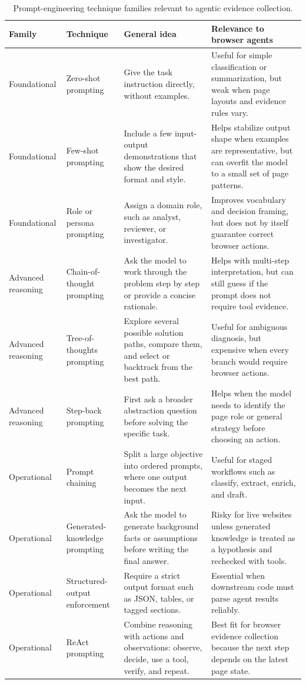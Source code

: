 \begin{table}[!htbp]
\centering
\footnotesize
\begin{tabularx}{\textwidth}{Q{2.55cm} Q{3.0cm} Y Y}
\toprule
{}
Family & Technique & General idea & Relevance to browser agents \\ \midrule
Foundational & Zero-shot prompting & Give the task instruction directly, without
examples. & Useful for simple classification or summarization, but weak when page
layouts and evidence rules vary. \\
Foundational & Few-shot prompting & Include a few input-output demonstrations that
show the desired format and style. & Helps stabilize output shape when examples are
representative, but can overfit the model to a small set of page patterns. \\
Foundational & Role or persona prompting & Assign a domain role, such as analyst,
reviewer, or investigator. & Improves vocabulary and decision framing, but does not by
itself guarantee correct browser actions. \\
Advanced reasoning & Chain-of-thought prompting & Ask the model to work through the
problem step by step or provide a concise rationale. & Helps with multi-step
interpretation, but can still guess if the prompt does not require tool evidence. \\
Advanced reasoning & Tree-of-thoughts prompting & Explore several possible solution
paths, compare them, and select or backtrack from the best path. & Useful for ambiguous
diagnosis, but expensive when every branch would require browser actions. \\
Advanced reasoning & Step-back prompting & First ask a broader abstraction question
before solving the specific task. & Helps when the model needs to identify the page
role or general strategy before choosing an action. \\
Operational & Prompt chaining & Split a large objective into ordered prompts, where
one output becomes the next input. & Useful for staged workflows such as classify,
extract, enrich, and draft. \\
Operational & Generated-knowledge prompting & Ask the model to generate background
facts or assumptions before writing the final answer. & Risky for live websites unless
generated knowledge is treated as a hypothesis and rechecked with tools. \\
Operational & Structured-output enforcement & Require a strict output format such as
JSON, tables, or tagged sections. & Essential when downstream code must parse agent
results reliably. \\
Operational & ReAct prompting & Combine reasoning with actions and observations:
observe, decide, use a tool, verify, and repeat. & Best fit for browser evidence
collection because the next step depends on the latest page state. \\
\bottomrule
\end{tabularx}
\caption{Prompt-engineering technique families relevant to agentic evidence collection.}\label{tab:prompt-engineering-techniques}
\end{table}

